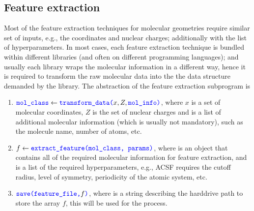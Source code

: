 \documentclass[12pt]{article}
\begin{document}
 





\subsection{Feature extraction}
\label{sub:fe}
Most of the feature extraction techniques for molecular geometries require similar set of inputs, e.g., the coordinates and nuclear charges; additionally with the list of hyperparameters. In most cases, each feature extraction technique is bundled within different libraries (and often on different programming languages); and usually each library wraps the molecular information in a different way, hence it is required to transform the raw molecular data into the the data structure demanded by the library. The abstraction of the feature extraction subprogram is
\begin{enumerate}
	\item $\codeword{mol_class} \leftarrow \codeword{transform_data(}x, Z, \codeword{mol_info)}$, where $x$ is a set of molecular coordinates, $Z$ is the set of nuclear charges and  is a list of additional molecular information (which is usually not mandatory), such as the molecule name, number of atoms, etc.
	\item $f \leftarrow \codeword{extract_feature(mol_class, params)}$, where  is an object that contains all of the required molecular information for feature extraction, and  is a list of the required hyperparameters, e.g., ACSF requires the cutoff radius, level of symmetry, periodicity of the atomic system, etc.
	\item $\codeword{save(feature_file,} f\codeword{)}$, where  is a string describing the harddrive path to store the array $f$, this will be used for the  process.
\end{enumerate}
\end{document}
